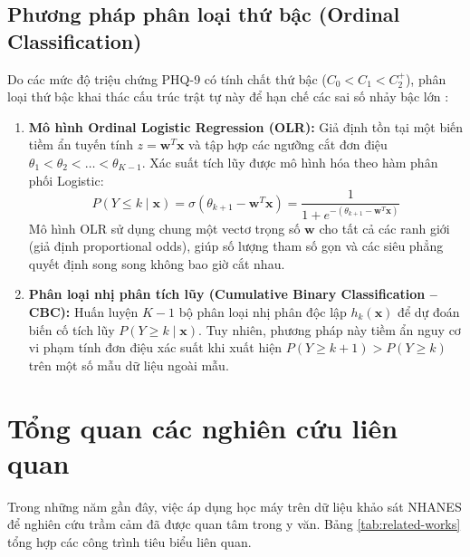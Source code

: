 \subsection{Phương pháp phân loại thứ bậc (Ordinal Classification)}
\label{subsec:ordinal-paradigm}

Do các mức độ triệu chứng PHQ-9 có tính chất thứ bậc ($C_0 < C_1 < C_2^+$), phân loại thứ bậc khai thác cấu trúc trật tự này để hạn chế các sai số nhảy bậc lớn \cite{mccullagh1980regression, frank2001simple}:
\begin{enumerate}
    \item \textbf{Mô hình Ordinal Logistic Regression (OLR):} Giả định tồn tại một biến tiềm ẩn tuyến tính $z = \mathbf{w}^T \mathbf{x}$ và tập hợp các ngưỡng cắt đơn điệu $\theta_1 < \theta_2 < \dots < \theta_{K-1}$. Xác suất tích lũy được mô hình hóa theo hàm phân phối Logistic:
    \begin{equation}
        P(Y \le k \mid \mathbf{x}) = \sigma(\theta_{k+1} - \mathbf{w}^T \mathbf{x}) = \frac{1}{1 + e^{-(\theta_{k+1} - \mathbf{w}^T \mathbf{x})}}
    \end{equation}
    Mô hình OLR sử dụng chung một vectơ trọng số $\mathbf{w}$ cho tất cả các ranh giới (giả định proportional odds), giúp số lượng tham số gọn và các siêu phẳng quyết định song song không bao giờ cắt nhau.
    \item \textbf{Phân loại nhị phân tích lũy (Cumulative Binary Classification -- CBC):} Huấn luyện $K-1$ bộ phân loại nhị phân độc lập $h_k(\mathbf{x})$ để dự đoán biến cố tích lũy $P(Y \ge k \mid \mathbf{x})$. Tuy nhiên, phương pháp này tiềm ẩn nguy cơ vi phạm tính đơn điệu xác suất khi xuất hiện $P(Y \ge k+1) > P(Y \ge k)$ trên một số mẫu dữ liệu ngoài mẫu.
\end{enumerate}

\section{Tổng quan các nghiên cứu liên quan}
\label{sec:nghien-cuu-lien-quan}

Trong những năm gần đây, việc áp dụng học máy trên dữ liệu khảo sát NHANES để nghiên cứu trầm cảm đã được quan tâm trong y văn. Bảng \ref{tab:related-works} tổng hợp các công trình tiêu biểu liên quan.

